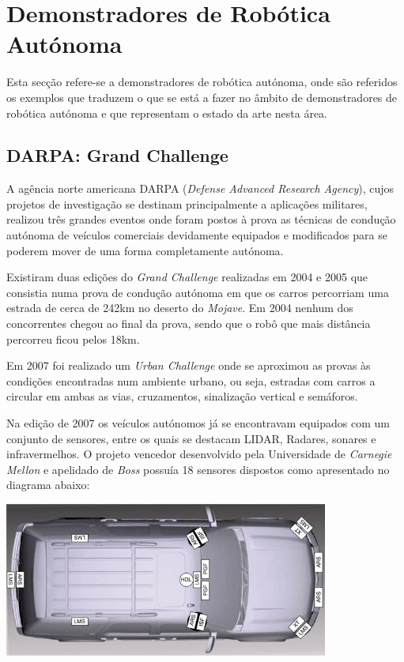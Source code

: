 \section{Demonstradores de Robótica Autónoma}
Esta secção refere-se a demonstradores de robótica autónoma, onde são referidos
os exemplos que traduzem o que se está a fazer no âmbito de demonstradores de
robótica autónoma e que representam o estado da arte nesta área.


\subsection{DARPA: Grand Challenge}
A agência norte americana DARPA (\emph{Defense Advanced Research Agency}), cujos projetos de investigação se destinam principalmente a aplicações militares, realizou três grandes eventos onde foram postos à prova as técnicas de condução autónoma de veículos comerciais devidamente equipados e modificados para se poderem mover de uma forma completamente autónoma.  

Existiram duas edições do \emph{Grand Challenge} realizadas em 2004 e 2005 que consistia numa prova de condução autónoma em que os carros percorriam uma estrada de cerca de 242km no deserto do \emph{Mojave}. Em 2004 nenhum dos concorrentes chegou ao final da prova, sendo que o robô que mais distância percorreu ficou pelos 18km.

Em 2007 foi realizado um \emph{Urban Challenge} onde se aproximou as provas às condições encontradas num ambiente urbano, ou seja, estradas com carros a circular em ambas as vias, cruzamentos, sinalização vertical  e semáforos.

Na edição de 2007 os veículos autónomos já se encontravam equipados com um conjunto de sensores, entre os quais se destacam LIDAR, Radares, sonares e infravermelhos. O projeto vencedor desenvolvido pela Universidade de \emph{Carnegie Mellon} e apelidado de \emph{Boss} \cite{Urmson:2008:ADU:1395073.1395077} possuía 18 sensores dispostos como apresentado no diagrama abaixo:

\begin{center}
	\includegraphics[width=0.80\textwidth]{./figures/boss_sensors.png}
	\label{fig:2}
\end{center}

